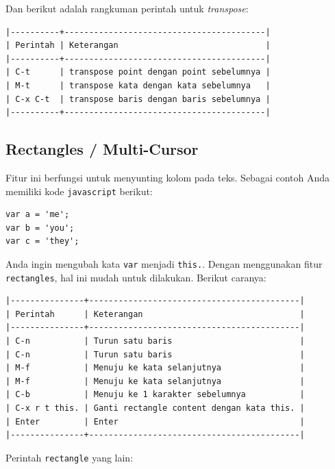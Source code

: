 \documentclass{article}
\begin{document}
Dan berikut adalah rangkuman perintah untuk \emph{transpose}:

\begin{verbatim}
|----------+-----------------------------------------|
| Perintah | Keterangan                              |
|----------+-----------------------------------------|
| C-t      | transpose point dengan point sebelumnya |
| M-t      | transpose kata dengan kata sebelumnya   |
| C-x C-t  | transpose baris dengan baris sebelumnya |
|----------+-----------------------------------------|
\end{verbatim}

\subsection{Rectangles / Multi-Cursor}
Fitur ini berfungsi untuk menyunting kolom pada teks. Sebagai contoh Anda 
memiliki kode \verb=javascript= berikut:

\begin{verbatim}
var a = 'me';
var b = 'you';
var c = 'they';
\end{verbatim}

Anda ingin mengubah kata \verb=var= menjadi \verb=this.=. Dengan menggunakan
fitur \verb=rectangles=, hal ini mudah untuk dilakukan. Berikut caranya:

\begin{verbatim}
|---------------+-------------------------------------------|
| Perintah      | Keterangan                                |
|---------------+-------------------------------------------|
| C-n           | Turun satu baris                          |
| C-n           | Turun satu baris                          |
| M-f           | Menuju ke kata selanjutnya                |
| M-f           | Menuju ke kata selanjutnya                |
| C-b           | Menuju ke 1 karakter sebelumnya           |
| C-x r t this. | Ganti rectangle content dengan kata this. |
| Enter         | Enter                                     |
|---------------+-------------------------------------------|
\end{verbatim}

Perintah \verb=rectangle= yang lain:
\end{document}
